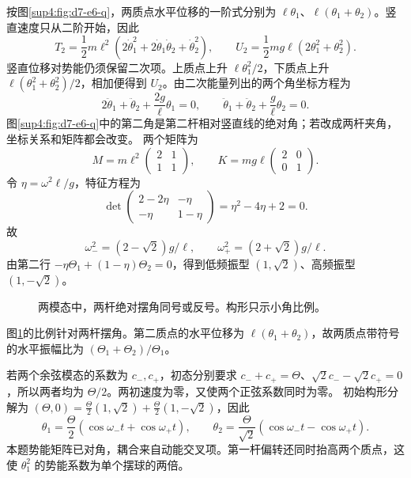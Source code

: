 \begin{solution}
按图\ref{sup4:fig:d7-e6-q}，两质点水平位移的一阶式分别为 $\ell\theta_1$、$\ell(\theta_1+\theta_2)$。竖直速度只从二阶开始，因此
\[
T_2=\frac12m\ell^2(2\dot\theta_1^2+2\dot\theta_1\dot\theta_2+\dot\theta_2^2),
\qquad U_2=\frac12mg\ell(2\theta_1^2+\theta_2^2).
\]
竖直位移对势能仍须保留二次项。上质点上升 $\ell\theta_1^2/2$，下质点上升 $\ell(\theta_1^2+\theta_2^2)/2$，相加便得到 $U_2$。由二次能量列出的两个角坐标方程为
\[
2\ddot\theta_1+\ddot\theta_2+\frac{2g}{\ell}\theta_1=0,\qquad
\ddot\theta_1+\ddot\theta_2+\frac g\ell\theta_2=0.
\]
图\ref{sup4:fig:d7-e6-q}中的第二角是第二杆相对竖直线的绝对角；若改成两杆夹角，坐标关系和矩阵都会改变。
两个矩阵为
\[
M=m\ell^2\begin{pmatrix}2&1\\1&1\end{pmatrix},\qquad
K=mg\ell\begin{pmatrix}2&0\\0&1\end{pmatrix}.
\]
令 $\eta=\omega^2\ell/g$，特征方程为
\[
\det\begin{pmatrix}2-2\eta&-\eta\\-\eta&1-\eta\end{pmatrix}
=\eta^2-4\eta+2=0.
\]
故
\[
\boxed{\omega_-^2=(2-\sqrt2)g/\ell,\qquad
\omega_+^2=(2+\sqrt2)g/\ell.}
\]
由第二行 $-\eta\Theta_1+(1-\eta)\Theta_2=0$，得到低频振型 $(1,\sqrt2)$、高频振型 $(1,-\sqrt2)$。
\begin{figure}[H]\centering
{}
\caption{两模态中，两杆绝对摆角同号或反号。构形只示小角比例。}\label{sup4:fig:d7-e6-s}
\end{figure}
图\ref{sup4:fig:d7-e6-s}的比例针对两杆摆角。第二质点的水平位移为 $\ell(\theta_1+\theta_2)$，故两质点带符号的水平振幅比为 $(\Theta_1+\Theta_2)/\Theta_1$。

若两个余弦模态的系数为 $c_-,c_+$，初态分别要求 $c_-+c_+=\Theta$、$\sqrt2c_--\sqrt2c_+=0$，所以两者均为 $\Theta/2$。两初速度为零，又使两个正弦系数同时为零。
初始构形分解为 $(\Theta,0)=\frac\Theta2(1,\sqrt2)+\frac\Theta2(1,-\sqrt2)$，因此
\[
\boxed{\theta_1=\frac\Theta2(\cos\omega_-t+\cos\omega_+t),\qquad
\theta_2=\frac\Theta{\sqrt2}(\cos\omega_-t-\cos\omega_+t).}
\]
本题势能矩阵已对角，耦合来自动能交叉项。第一杆偏转还同时抬高两个质点，这使 $\theta_1^2$ 的势能系数为单个摆球的两倍。
\end{solution}



